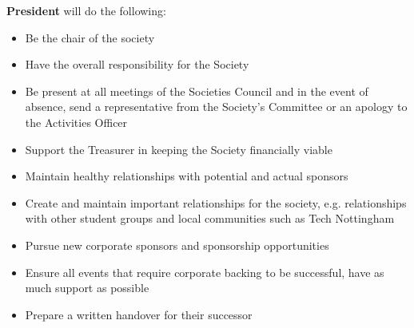 \begin{subclause}
  \textbf{President} will do the following:
  \begin{itemize}[label=--,topsep=0em,itemsep=0em]
    \item Be the chair of the society
    \item Have the overall responsibility for the Society
    \item Be present at all meetings of the Societies Council and in the event of absence, send a representative from the Society's Committee or an apology to the Activities Officer
    \item Support the Treasurer in keeping the Society financially viable
    \item Maintain healthy relationships with potential and actual sponsors
    \item Create and maintain important relationships for the society, e.g. relationships with other student groups and local communities such as Tech Nottingham
    \item Pursue new corporate sponsors and sponsorship opportunities
    \item Ensure all events that require corporate backing to be successful, have as much support as possible
    \item Prepare a written handover for their successor
  \end{itemize}
\end{subclause}
